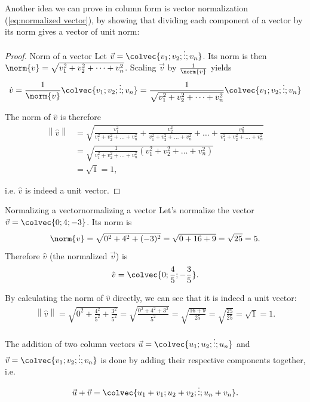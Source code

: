 Another idea we can prove in column form is vector normalization (\autoref{eq:normalized vector}), by showing that dividing each component of a vector by its norm gives a vector of unit norm:
\begin{proof}{Norm of a vector}{}
	Let $\vec{v}=\colvec{v_{1};v_{2};\vdots;v_{n}}$. Its norm is then $\norm{v}=\sqrt{v_{1}^{2}+v_{2}^{2}+\dots+v_{n}^{2}}$. Scaling $\vec{v}$ by $\frac{1}{\norm{v}}$ yields
	\begin{equation*}
		\hat{v} = \frac{1}{\norm{v}}\colvec{v_{1};v_{2};\vdots;v_{n}} = \frac{1}{\sqrt{v_{1}^{2}+v_{2}^{2}+\dots+v_{n}^{2}}}\colvec{v_{1};v_{2};\vdots;v_{n}}
	\end{equation*}

	The norm of $\hat{v}$ is therefore
	\begin{align*}
		\left\| \hat{v} \right\| &= \sqrt{\frac{v_{1}^{2}}{v_{1}^{2}+v_{2}^{2}+\dots+v_{n}^{2}} + \frac{v_{2}^{2}}{v_{1}^{2}+v_{2}^{2}+\dots+v_{n}^{2}} + \dots + \frac{v_{n}^{2}}{v_{1}^{2}+v_{2}^{2}+\dots+v_{n}^{2}}}\\
		&= \sqrt{\frac{1}{v_{1}^{2}+v_{2}^{2}+\dots+v_{n}^{2}}\left(v_{1}^{2}+v_{2}^{2}+\dots+v_{n}^{2} \right)}\\
		&= \sqrt{1} = 1,
	\end{align*}

	i.e. $\hat{v}$ is indeed a unit vector.
\end{proof}

\begin{example}{Normalizing a vector}{normalizing a vector}
	Let's normalize the vector $\vec{v}=\colvec{0;4;-3}$. Its norm is
	\[
		\norm{v} = \sqrt{0^{2}+4^{2}+(-3)^{2}} = \sqrt{0+16+9} = \sqrt{25} = 5.
	\]
	Therefore $\hat{v}$ (the normalized $\vec{v}$) is
	\[
		\hat{v} = \colvec{0;\frac{4}{5};-\frac{3}{5}}.
	\]

	By calculating the norm of $\hat{v}$ directly, we can see that it is indeed a unit vector:
	\begin{align*}
		\left\|\hat{v}\right\| = \sqrt{0^{2} + \frac{4^{2}}{5^{2}} + \frac{3^{2}}{5^{2}}} = \sqrt{\frac{0^{2}+4^{2}+3^{2}}{5^{2}}} = \sqrt{\frac{16+9}{25}} = \sqrt{\frac{25}{25}} = \sqrt{1} = 1.
	\end{align*}
\end{example}

The addition of two column vectors $\vec{u}=\colvec{u_{1};u_{2};\vdots;u_{n}}$ and $\vec{v}=\colvec{v_{1};v_{2};\vdots;v_{n}}$ is done by adding their respective components together, i.e.
\begin{equation}
	\vec{u} + \vec{v} = \colvec{u_{1}+v_{1};u_{2}+v_{2};\vdots;u_{n}+v_{n}}.
	\label{eq:adding vectors}
\end{equation}

